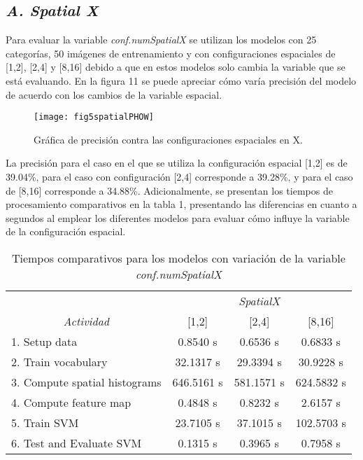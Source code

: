 \documentclass[10pt,twocolumn,letterpaper]{article}
\begin{document}
\subsection{ \textit{A. Spatial X}}

Para evaluar la variable \textit{conf.numSpatialX} se utilizan los modelos con 25 categorías, 50 imágenes de entrenamiento y con configuraciones espaciales de [1,2], [2,4] y [8,16] debido a que en estos modelos solo cambia la variable que se está evaluando. En la figura 11 se puede apreciar cómo varía precisión del modelo de acuerdo con los cambios de la variable espacial.

\begin{figure}
\begin{center}
   \texttt{[image: fig5spatialPHOW]}
\end{center}
   \caption{Gráfica de precisión contra las configuraciones espaciales en X.}
\end{figure}

La precisión para el caso en el que se utiliza la configuración espacial [1,2] es de 39.04\%, para el caso con configuración [2,4] corresponde a 39.28\%, y para el caso de [8,16] corresponde a 34.88\%. Adicionalmente, se presentan los tiempos de procesamiento comparativos en la tabla 1, presentando las diferencias en cuanto a segundos al emplear los diferentes modelos para evaluar cómo influye la variable de la configuración espacial.

\begin{table*}
\caption{Tiempos comparativos para los modelos con variación de la variable \textit{conf.numSpatialX}}
\centering
\begin{tabular}{lccc}
 & \multicolumn{3}{c}{\textit{SpatialX}} \\
\multicolumn{1}{c}{\textit{Actividad}} & {[}1,2{]} & {[}2,4{]} & {[}8,16{]} \\ \hline
1. Setup data & 0.8540 s & 0.6536 s & 0.6833 s \\ \hline
2. Train vocabulary & 32.1317 s & 29.3394 s & 30.9228 s \\ \hline
3. Compute spatial histograms & 646.5161 s & 581.1571 s & 624.5832 s \\ \hline
4. Compute feature map & 0.4848 s & 0.8232 s & 2.6157 s \\ \hline
5. Train SVM & 23.7105 s & 37.1015 s & 102.5703 s \\ \hline
6. Test and Evaluate SVM & 0.1315 s & 0.3965 s & 0.7958 s \\ \hline
\end{tabular}
\end{table*}
\end{document}

